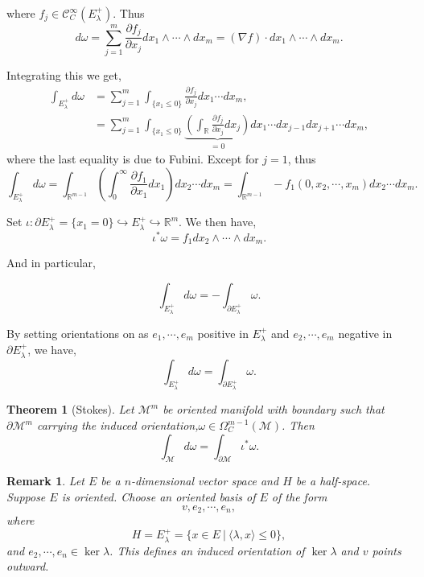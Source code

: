 \documentclass[8pt]{article}
\newtheorem{theorem}{Theorem} [section]
\newtheorem{remark}{Remark}[section]
\newcommand{\R}[0]{\mathbb{R}}
\newcommand{\M}[0]{\mathcal{M}}
\newcommand{\cinf}[0]{\mathcal{C}^\infty}
\newcommand{\sep}[0]{\:|\:}
\newcommand{\pd}[2]{{\frac {\partial #1} {\partial #2}}}
\begin{document}
where $f_j\in\cinf_C(E_\lambda^+)$. Thus 
\begin{equation*}
  d\omega = \sum_{j=1}^m \pd{f_j}{x_j}dx_1\wedge\cdots\wedge dx_m = (\nabla f)\cdot dx_1\wedge\cdots\wedge dx_m.
\end{equation*}

Integrating this we get,
\begin{align*}
  \int_{E_\lambda^+}d\omega & = \sum_{j=1}^m\int_{\{x_1\leq 0\}}\pd{f_j}{x_j}dx_1\cdots dx_m,\\
  & =\sum_{j=1}^m\int_{\{x_1\leq 0\}}\underbrace{\left(\int_\R\pd{f_j}{x_j}dx_j\right)}_{=0}dx_1\cdots dx_{j-1}dx_{j+1}\cdots dx_m,
\end{align*}
where the last equality is due to Fubini. Except for $j=1$, thus 
\begin{equation*}
  \int_{E_\lambda^+}d\omega = \int_{\R^{m-1}}\left(\int_0^\infty\pd{f_1}{x_1}dx_1\right)dx_2\cdots dx_m = \int_{\R^{m-1}}-f_1(0,x_2,\cdots,x_m)dx_2\cdots dx_m.
\end{equation*}

Set $\iota:\partial E_\lambda^+ = \{x_1=0\}\hookrightarrow E_\lambda^+\hookrightarrow\R^m$. We then have,
\begin{equation*}
  \iota^*\omega = f_1dx_2\wedge\cdots\wedge dx_m.
\end{equation*}

And in particular,

\begin{equation*}
  \int_{E_\lambda^+}d\omega = -\int_{\partial E_\lambda^+}\omega.
\end{equation*}

By setting orientations on as $e_1,\cdots,e_m$ positive in $E_\lambda^+$ and $e_2,\cdots,e_m$ negative in $\partial E_\lambda^+$, we have, 
\begin{equation*}
  \int_{E_\lambda^+}d\omega = \int_{\partial E_\lambda^+}\omega.
\end{equation*}

\begin{theorem}[Stokes]
  Let $\M^m$ be oriented manifold with boundary such that $\partial\M^m$ carrying the induced orientation,$ \omega\in\Omega_C^{m-1}(\M)$. Then 
  \begin{equation*}
    \int_{\M}d\omega = \int_{\partial \M}\iota^*\omega.
  \end{equation*}
\end{theorem}

\begin{remark}
  Let $E$ be a $n$-dimensional vector space and $H$ be a half-space. Suppose $E$ is oriented. Choose an oriented basis of $E$ of the form 
  \begin{equation*}
    v,e_2,\cdots,e_n,
  \end{equation*}
  where 
  \begin{equation*}
    H = E_\lambda^+=\{x\in E\sep \langle \lambda,x\rangle\leq0\},
  \end{equation*}
  and $e_2,\cdots,e_n\in\ker \lambda$. This defines an induced orientation of $\ker\lambda$ and $v$ points outward.
\end{remark}
\end{document}
